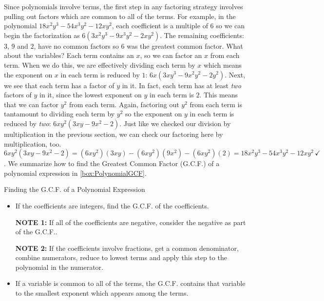 Since polynomials involve terms, the first step in any factoring strategy involves pulling out factors which are common to all of the terms.  For example, in the polynomial $18x^2y^3 - 54x^3y^2 - 12xy^2$,  each coefficient is a multiple of $6$ so we can begin the factorization as $6(3x^2y^3 - 9x^3y^2 - 2xy^2)$.  The remaining coefficients: $3$, $9$ and $2$, have no common factors so $6$ was the greatest common factor.  What about the variables? Each term contains an $x$, so we can factor an $x$ from each term.  When we do this, we are effectively dividing each term by $x$ which means the exponent on  $x$ in each term is reduced by $1$:  $6x(3xy^3 - 9x^2y^2 - 2y^2)$.  Next, we see that each term has a factor of $y$ in it.  In fact, each term has at least \textit{two} factors of $y$ in it, since the lowest exponent on $y$ in each term is $2$. This means that we can factor $y^2$ from each term. Again, factoring out $y^2$ from each term is tantamount to dividing each term by $y^2$ so the exponent on $y$ in each term is reduced by \textit{two}:  $6xy^2(3xy - 9x^2 - 2)$.  Just like we checked our division by multiplication in the previous section, we can check our factoring here by multiplication, too.  $6xy^2(3xy - 9x^2 - 2) = (6xy^2)(3xy) - (6xy^2)(9x^2) - (6xy^2)(2) = 18x^2y^3 - 54x^3y^2  - 12xy^2 \, \checkmark$.  We summarize how to find the Greatest Common Factor (G.C.F.) of a polynomial expression in \autoref{box:PolynomialGCF}.

\begin{floatbox}[label=box:PolynomialGCF]{Finding the G.C.F. of a Polynomial Expression}

\begin{itemize}[leftmargin=*]

\item If the coefficients are integers, find the G.C.F. of the coefficients. 

\textbf{NOTE 1:}  If all of the coefficients are negative, consider the negative as part of the G.C.F..

\textbf{NOTE 2:}  If the coefficients involve fractions, get a common denominator, combine numerators, reduce to lowest terms and apply this step to the polynomial in the numerator.

\item  If a variable is common to all of the terms, the G.C.F. contains that variable to the smallest exponent which appears among the terms.

\end{itemize}

\end{floatbox}

